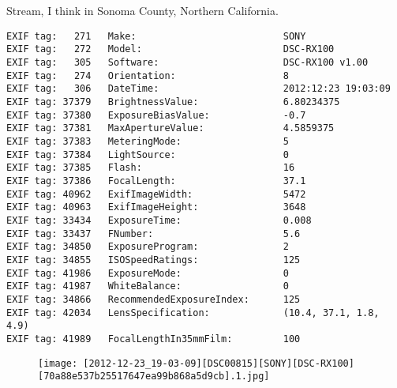 \section{\protect{}}
\noindent Stream, I think in Sonoma County, Northern California.
\noindent
\begin{lstlisting}
EXIF tag:   271   Make:                          SONY
EXIF tag:   272   Model:                         DSC-RX100
EXIF tag:   305   Software:                      DSC-RX100 v1.00
EXIF tag:   274   Orientation:                   8
EXIF tag:   306   DateTime:                      2012:12:23 19:03:09
EXIF tag: 37379   BrightnessValue:               6.80234375
EXIF tag: 37380   ExposureBiasValue:             -0.7
EXIF tag: 37381   MaxApertureValue:              4.5859375
EXIF tag: 37383   MeteringMode:                  5
EXIF tag: 37384   LightSource:                   0
EXIF tag: 37385   Flash:                         16
EXIF tag: 37386   FocalLength:                   37.1
EXIF tag: 40962   ExifImageWidth:                5472
EXIF tag: 40963   ExifImageHeight:               3648
EXIF tag: 33434   ExposureTime:                  0.008
EXIF tag: 33437   FNumber:                       5.6
EXIF tag: 34850   ExposureProgram:               2
EXIF tag: 34855   ISOSpeedRatings:               125
EXIF tag: 41986   ExposureMode:                  0
EXIF tag: 41987   WhiteBalance:                  0
EXIF tag: 34866   RecommendedExposureIndex:      125
EXIF tag: 42034   LensSpecification:             (10.4, 37.1, 1.8, 4.9)
EXIF tag: 41989   FocalLengthIn35mmFilm:         100

\end{lstlisting}
\clearpage
\begin{figure}
\raggedleft
\texttt{[image: [2012-12-23\_19-03-09][DSC00815][SONY][DSC-RX100][70a88e537b25517647ea99b868a5d9cb].1.jpg]}
\end{figure}


\clearpage
